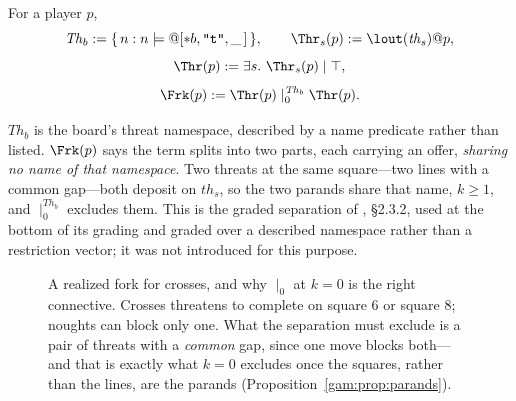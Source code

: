 \begin{definition}\label{gam:def:fork}
For a player $p$,
\[
\mathit{Th}_b := \{\, n : n \models @[*b,\texttt{"t"},\_\,] \,\}, \qquad
\Thr_s(p) := \lout(\mathit{th}_s)@p,
\]
\[
\Thr(p) := \exists s.\ \Thr_s(p) \mid \top,
\]
\[
\Frk(p) := \Thr(p) \mid_0^{\mathit{Th}_b} \Thr(p) .
\]
\end{definition}

$\mathit{Th}_b$ is the board's threat namespace, described by a name predicate
rather than listed. $\Frk(p)$ says the term splits into two parts, each carrying
an offer, \emph{sharing no name of that namespace}. Two threats at the same
square---two lines with a common gap---both deposit on $\mathit{th}_s$, so the
two parands share that name, $k \geq 1$, and $\mid_0^{\mathit{Th}_b}$ excludes
them. This is the graded separation of \cite{ClassifierNote}, \S2.3.2, used at the
bottom of its grading and graded over a described namespace rather than a
restriction vector; it was not introduced for this purpose.

\begin{figure}[t]
\centering
{}
\caption{A realized fork for crosses, and why $\mid_0$ at $k=0$ is the right
connective. Crosses threatens to complete on square $6$ or square $8$; noughts
can block only one. What the separation must exclude is a pair of threats with a
\emph{common} gap, since one move blocks both---and that is exactly what $k=0$
excludes once the squares, rather than the lines, are the parands
(Proposition~\ref{gam:prop:parands}).}
\label{gam:fig:fork}
\end{figure}

